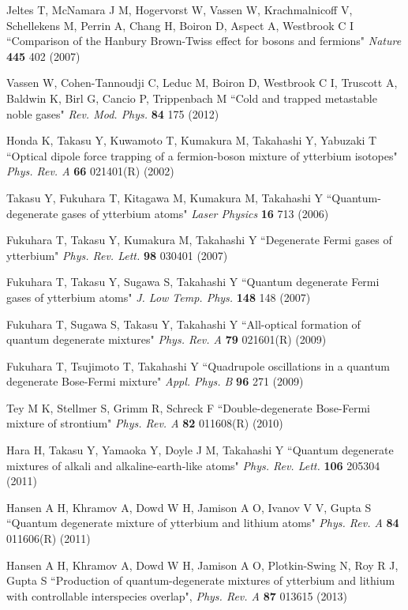 \documentclass[pra,letterpaper,twocolumn,showpacs,superscriptaddress]{revtex4}
\begin{document}
\begin{thebibliography}{300}
 Jeltes T, McNamara J M, Hogervorst W, Vassen W, Krachmalnicoff V, 
Schellekens M, Perrin A, Chang H, Boiron D, Aspect A, Westbrook C I
``Comparison of the Hanbury Brown-Twiss effect for bosons and fermions" {\it Nature} \textbf{445} 402 (2007)

 Vassen W, Cohen-Tannoudji C, Leduc M, Boiron D, Westbrook C I, Truscott A, Baldwin K, Birl G, Cancio P, Trippenbach M 
``Cold and trapped metastable noble gases" {\it Rev. Mod. Phys.} \textbf{84} 175 (2012)

 Honda K, Takasu Y, Kuwamoto T, Kumakura M, Takahashi Y, Yabuzaki T
``Optical dipole force trapping of a fermion-boson mixture of ytterbium isotopes"
{\it Phys. Rev. A} \textbf{66} 021401(R) (2002)

 Takasu Y, Fukuhara T, Kitagawa M, Kumakura M, Takahashi Y
``Quantum-degenerate gases of ytterbium atoms" {\it Laser Physics} \textbf{16} 713 (2006)

  Fukuhara T, Takasu Y, Kumakura M, Takahashi Y
``Degenerate Fermi gases of ytterbium" {\it Phys. Rev. Lett.} \textbf{98} 030401 (2007)

  Fukuhara T, Takasu Y, Sugawa S, Takahashi Y
``Quantum degenerate Fermi gases of ytterbium atoms" {\it J. Low Temp. Phys.} \textbf{148} 148 (2007)

  Fukuhara T, Sugawa S, Takasu Y, Takahashi Y
``All-optical formation of quantum degenerate mixtures" {\it Phys. Rev. A} \textbf{79} 021601(R) (2009)

  Fukuhara T, Tsujimoto T, Takahashi Y 
``Quadrupole oscillations in a quantum degenerate Bose-Fermi mixture" {\it Appl. Phys. B} \textbf{96} 271 (2009)

 Tey M K, Stellmer S, Grimm R, Schreck F
``Double-degenerate Bose-Fermi mixture of strontium"
{\it Phys. Rev. A} \textbf{82} 011608(R) (2010)

 Hara H, Takasu Y, Yamaoka Y, Doyle J M, Takahashi Y
``Quantum degenerate mixtures of alkali and alkaline-earth-like atoms" {\it Phys. Rev. Lett.} \textbf{106} 205304 (2011)

 Hansen A H, Khramov A, Dowd W H, Jamison A O, Ivanov V V, Gupta S
``Quantum degenerate mixture of ytterbium and lithium atoms" {\it Phys. Rev. A} \textbf{84} 011606(R) (2011)

 Hansen A H, Khramov A, Dowd W H, Jamison A O, Plotkin-Swing N, Roy R J, Gupta S
``Production of quantum-degenerate mixtures of ytterbium and lithium with controllable interspecies overlap", 
{\it Phys. Rev. A} \textbf{87} 013615 (2013)


\end{thebibliography}
\end{document}
